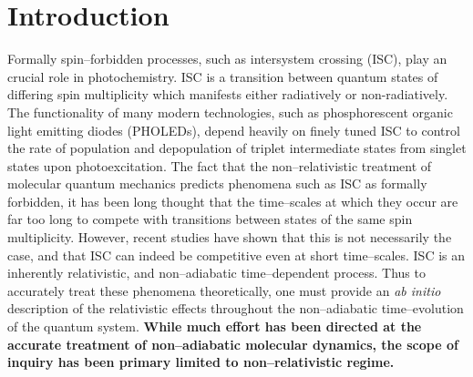 \section{Introduction}

Formally spin--forbidden processes, such as intersystem crossing (ISC),  play an
crucial role in photochemistry.\cite{Marian_SOC,Scaiano_Photo,Steer93_CR67} ISC
is a transition between quantum states of differing spin multiplicity which
manifests either radiatively or non-radiatively.  The functionality of many
modern technologies, such as phosphorescent organic light emitting diodes
(PHOLEDs)\cite{Miyaguchi99_JAP1502}, depend heavily on finely tuned ISC to
control the rate of population and depopulation of triplet intermediate states
from singlet states upon photoexcitation. The fact that the non--relativistic
treatment of molecular quantum mechanics predicts phenomena such as ISC as
formally forbidden, it has been long thought that the time--scales at which
they occur are far too long to compete with transitions between states of the
same spin multiplicity.\cite{Marian_SOC} However, recent studies have shown
that this is not necessarily the case, and that ISC can indeed be competitive
even at short time--scales.\cite{Marian_SOC,Li16_JA2,Lim74_CPL}  ISC is an
inherently relativistic, and non--adiabatic time--dependent
process\cite{Dyall07_book,Reiher15_book}.  Thus to accurately treat these
phenomena theoretically, one must provide an \emph{ab initio} description of
the relativistic effects throughout the non--adiabatic time--evolution of the
quantum system.  {\bf While much effort has been directed at the accurate
treatment of non--adiabatic molecular dynamics, the scope of inquiry has been
primary limited to non--relativistic regime.}

